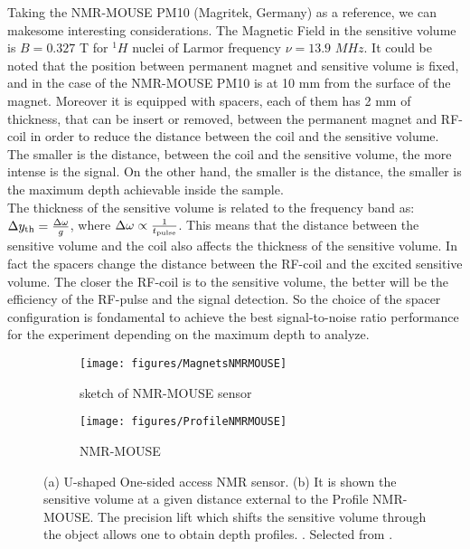 \documentclass[a4paper,11pt]{report}
\begin{document}
Taking the NMR-MOUSE PM10 (Magritek, Germany) as a reference, we can makesome interesting considerations.
The Magnetic Field in the sensitive volume is $B=0.327$ T for $^1H$ nuclei of Larmor frequency  $\nu = 13.9$ $ MHz$. It could be noted that the position between permanent magnet and sensitive volume is fixed, and in the case of the NMR-MOUSE PM10 is at 10 mm from the surface of the magnet. Moreover it is equipped with spacers, each of them has 2 mm of thickness, that can be insert or removed, between the permanent magnet and RF-coil in order to reduce the distance between the coil and the sensitive volume. \\
The smaller is the distance, between the coil and the sensitive volume, the more intense is the signal. On the other hand, the smaller is the distance, the smaller is the maximum depth achievable inside the sample\cite{dodici}.\\
The thickness of the sensitive volume is related to the frequency band as:
$\Delta{y_\textup{th}}= \frac{\Delta\omega}{g}$, where $\Delta \omega \propto \frac{1}{t_\textup{pulse}}$. 
This means that the distance between the sensitive volume and the coil also affects the thickness of the sensitive volume. In fact the spacers change the distance between the RF-coil and the excited sensitive volume. The closer the RF-coil is to the sensitive volume, the better will be the efficiency of the RF-pulse and the signal detection. So the choice of the spacer configuration is fondamental to achieve the best signal-to-noise ratio performance for the experiment depending on the maximum depth to analyze\cite{dodici}.

\begin{figure}[h]
\begin{subfigure}{0.5\textwidth}
\texttt{[image: figures/MagnetsNMRMOUSE]} 
\caption{sketch of NMR-MOUSE sensor}\label{magnets}
\end{subfigure}
\begin{subfigure}{0.5\textwidth}
\texttt{[image: figures/ProfileNMRMOUSE]}
\caption{NMR-MOUSE}\label{NMRprofile}
\end{subfigure}
 


\caption{(a) U-shaped One-sided access NMR sensor. (b) It is shown the sensitive volume at a given distance external to the Profile NMR-MOUSE. The precision lift which shifts the sensitive volume through the object allows one to obtain depth profiles.
. Selected from \cite{cinque}.}
\end{figure}
\end{document}
